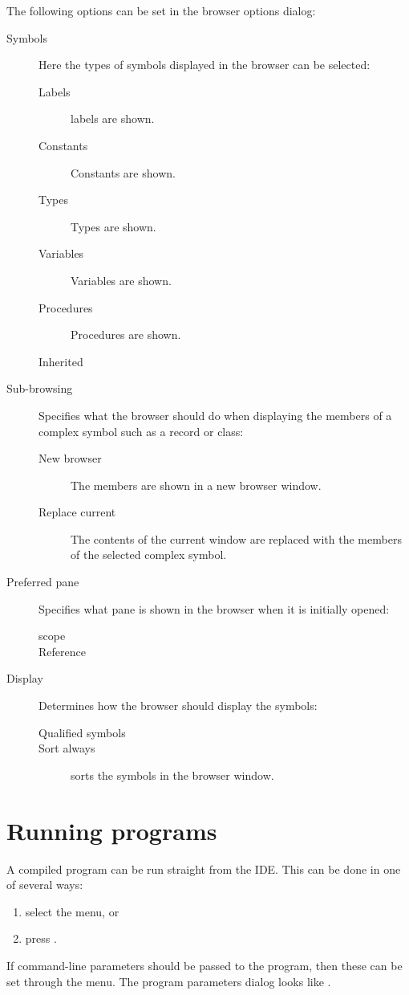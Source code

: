 The following options can be set in the browser options dialog:
\begin{description}
\item[Symbols] Here the types of symbols displayed in the browser can be
selected:
\begin{description}
\item[Labels] labels are shown.
\item[Constants] Constants are shown.
\item[Types] Types are shown.
\item[Variables] Variables are shown.
\item[Procedures] Procedures are shown.
\item[Inherited]
\end{description}
\item[Sub-browsing] Specifies what the browser should do when displaying the
members of a complex symbol such as a record or class:
\begin{description}
\item[New browser] The members are shown in a new browser window.
\item[Replace current] The contents of the current window are replaced with
the members of the selected complex symbol.
\end{description}
\item[Preferred pane] Specifies what pane is shown in the browser when it is
initially opened:
\begin{description}
\item[scope]
\item[Reference]
\end{description}
\item[Display] Determines how the browser should display the symbols:
\begin{description}
\item[Qualified symbols]
\item[Sort always] sorts the symbols in the browser window.
\end{description}
\end{description}

\section{Running programs}
\label{se:running}
A compiled program can be run straight from the IDE. This can be done
in one of several ways:
\begin{enumerate}
\item select the  menu, or
\item press .
\end{enumerate}
If command-line parameters should be passed to the program, then these
can be set through the  menu.
The program parameters dialog looks like .

